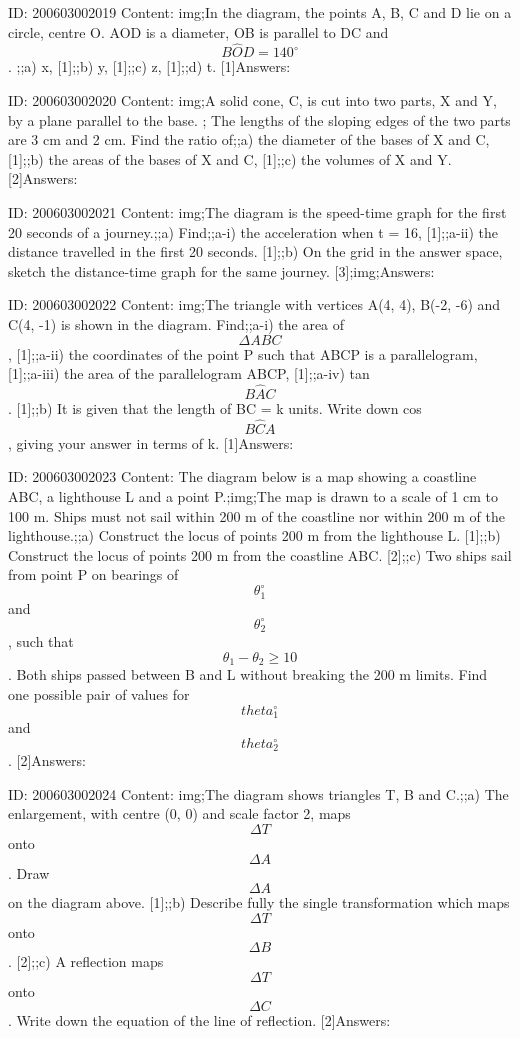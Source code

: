 \documentclass{article}
\begin{document}
ID: 200603002019
Content:
img;In the diagram, the points A, B, C and D lie on a circle, centre O. AOD is a diameter, OB is parallel to DC and $$B \hat OD=140^{\circ}$$. ;;a) x, [1];;b) y, [1];;c) z, [1];;d) t. [1]Answers:

ID: 200603002020
Content:
img;A solid cone, C, is cut into two parts, X and Y, by a plane parallel to the base. ; The lengths of the sloping edges of the two parts are 3 cm and 2 cm. Find the ratio of;;a) the diameter of the bases of X and C, [1];;b) the areas of the bases of X and C, [1];;c) the volumes of X and Y. [2]Answers:

ID: 200603002021
Content:
img;The diagram is the speed-time graph for the first 20 seconds of a journey.;;a) Find;;a-i) the acceleration when t = 16, [1];;a-ii) the distance travelled in the first 20 seconds. [1];;b) On the grid in the answer space, sketch the distance-time graph for the same journey. [3];img;Answers:

ID: 200603002022
Content:
img;The triangle with vertices A(4, 4), B(-2, -6) and C(4, -1) is shown in the diagram. Find;;a-i) the area of $$\Delta ABC$$, [1];;a-ii) the coordinates of the point P such that ABCP is a parallelogram, [1];;a-iii) the area of the parallelogram ABCP, [1];;a-iv) tan $$B \hat AC$$. [1];;b) It is given that the length of BC = k units. Write down cos $$B \hat CA$$, giving your answer in terms of k. [1]Answers:

ID: 200603002023
Content:
The diagram below is a map showing a coastline ABC, a lighthouse L and a point P.;img;The map is drawn to a scale of 1 cm to 100 m. Ships must not sail within 200 m of the coastline nor within 200 m of the lighthouse.;;a) Construct the locus of points 200 m from the lighthouse L. [1];;b) Construct the locus of points 200 m from the coastline ABC. [2];;c) Two ships sail from point P on bearings of $$\theta_1^{\circ}$$ and $$\theta_2^{\circ}$$, such that $$\theta_1 - \theta_2 \geq 10$$. Both ships passed between B and L without breaking the 200 m limits. Find one possible pair of values for $$theta_1^{\circ}$$ and $$theta_2^{\circ}$$. [2]Answers:

ID: 200603002024
Content:
img;The diagram shows triangles T, B and C.;;a) The enlargement, with centre (0, 0) and scale factor 2, maps $$\Delta  T$$ onto $$\Delta  A$$. Draw $$\Delta  A$$ on the diagram above. [1];;b) Describe fully the single transformation which maps $$\Delta  T $$ onto $$\Delta  B$$. [2];;c) A reflection maps $$\Delta  T$$ onto $$\Delta  C$$. Write down the equation of the line of reflection. [2]Answers:
\end{document}
